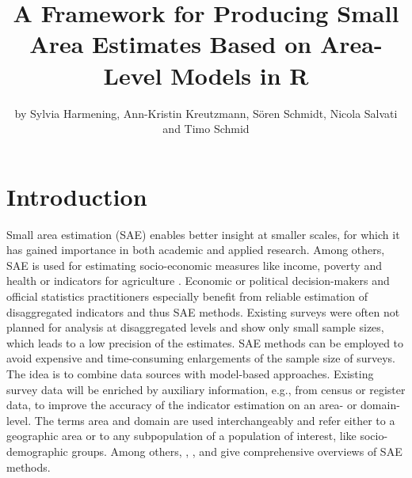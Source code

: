 \title{A Framework for Producing Small Area Estimates Based on Area-Level Models in R}
\author{by Sylvia Harmening, Ann-Kristin Kreutzmann, Sören Schmidt, Nicola Salvati and Timo Schmid}

\maketitle


\section[introduction]{Introduction} \label{sec:intro}
Small area estimation (SAE) enables better insight at smaller scales,
for which it has gained importance in both academic and applied research.
Among others, SAE is used for estimating socio-economic measures
like income, poverty and health or indicators for agriculture
\citep{Datta1991, Tzavidis2012, Zhang2015, Pratesi2016}. Economic or political decision-makers
and official statistics practitioners especially benefit from reliable
estimation of disaggregated indicators and thus SAE methods. Existing surveys were
often not planned for analysis at disaggregated levels and show only small sample sizes,
which leads to a low precision of the estimates.
SAE methods can be employed to avoid expensive and time-consuming enlargements of
the sample size of surveys. The idea is to combine data sources with model-based
approaches. Existing survey data will be enriched by auxiliary information, e.g.,
from census or register data, to improve the accuracy of the indicator estimation on
an area- or domain- level. The terms area and domain are used interchangeably and refer
either to a geographic area or to any subpopulation of a population of interest, like
socio-demographic groups.
Among others, \citet{Pfeffermann2013}, \citet{Rao2015}, \citet{Tzavidis2018} and
\citet{Jiang2020} give comprehensive overviews of SAE methods.

